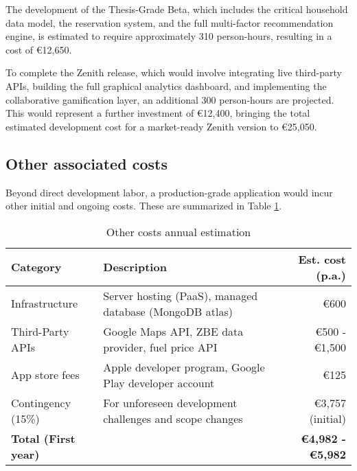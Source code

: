 The development of the Thesis-Grade Beta, which includes the critical household data model, the reservation system, and the full multi-factor recommendation engine, is estimated to require approximately 310 person-hours, resulting in a cost of €12,650.

\textgap

To complete the Zenith release, which would involve integrating live third-party APIs, building the full graphical analytics dashboard, and implementing the collaborative gamification layer, an additional 300 person-hours are projected. This would represent a further investment of €12,400, bringing the total estimated development cost for a market-ready Zenith version to €25,050.

\subsection{Other associated costs}

Beyond direct development labor, a production-grade application would incur other initial and ongoing costs. These are summarized in Table \ref{tab:other_costs}.

\begin{table}[H]
\normalsize
\centering
\caption{Other costs annual estimation}
\label{tab:other_costs}
\begin{tabular}{l|p{6.6cm}|r}
\hline
\textbf{Category} & \textbf{Description} & \textbf{Est. cost (p.a.)} \\
\hline
Infrastructure & Server hosting (PaaS), managed database (MongoDB atlas) & €600 \\
Third-Party APIs & Google Maps API, ZBE data provider, fuel price API & €500 - €1,500 \\
App store fees & Apple developer program, Google Play developer account & €125 \\
Contingency (15\%) & For unforeseen development challenges and scope changes & €3,757 (initial) \\
\hline
\textbf{Total (First year)} & & \textbf{€4,982 - €5,982} \\
\hline
\end{tabular}
\end{table}
